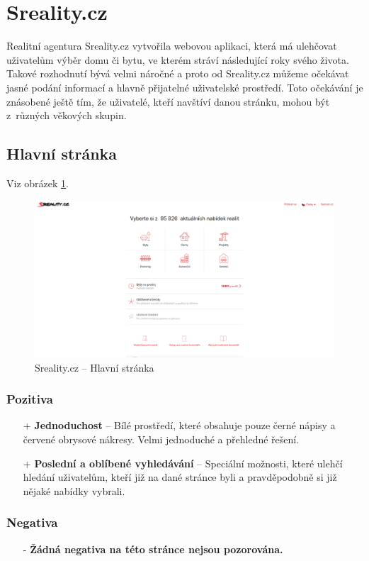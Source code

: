 \section{Sreality.cz}
\label{analyza:sreality}
Realitní agentura Sreality.cz \cite{sreality} vytvořila webovou aplikaci, která má ulehčovat uživatelům výběr domu či bytu, ve kterém stráví následující roky svého života. Takové rozhodnutí bývá velmi náročné a proto od Sreality.cz můžeme očekávat jasné podání informací a hlavně přijatelné uživatelské prostředí. Toto očekávání je znásobené ještě tím, že uživatelé, kteří navštíví danou stránku, mohou být z~různých věkových skupin.

\subsection{Hlavní stránka}
Viz obrázek \ref{fig:sreality:homepage}.
\begin{figure}[h]
    \centering
    \includegraphics[width=1.0\textwidth]{media/sreality/homepage.png}
    \caption{Sreality.cz -- Hlavní stránka}
    \label{fig:sreality:homepage}
\end{figure}
\subsubsection*{Pozitiva}
\begin{itemize}
    \item[+] \textbf{Jednoduchost} -- Bílé prostředí, které obsahuje pouze černé nápisy a červené obrysové nákresy. Velmi jednoduché a přehledné řešení.
    \item[+] \textbf{Poslední a oblíbené vyhledávání} -- Speciální možnosti, které ulehčí hledání uživatelům, kteří již na dané stránce byli a pravděpodobně si již nějaké nabídky vybrali.
\end{itemize}
\subsubsection*{Negativa}
\begin{itemize}
    \item[-] \textbf{Žádná negativa na této stránce nejsou pozorována.}
\end{itemize}


